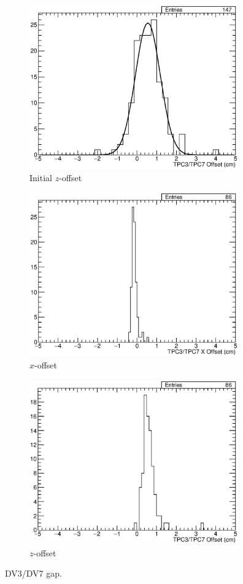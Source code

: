 \begin{figure}
  \centering
  \begin{subfigure}[t]{\linewidth}
    \centering
    \includegraphics[width=9cm]{TPC3TPC7Gap.eps}
    \caption{Initial $z$-offset}
    \label{fig:AppendixTPC3TPC7Gap}
  \end{subfigure}
  \vfill
  \begin{subfigure}[t]{\linewidth}
    \centering
    \includegraphics[width=9cm]{TPC3TPC7XOff.eps}
    \caption{$x$-offset}
    \label{fig:AppendixTPC3TPC7XOff}
  \end{subfigure}
  \vfill
  \begin{subfigure}[t]{\linewidth}
    \centering
    \includegraphics[width=9cm]{TPC3TPC7ZOff.eps}
    \caption{$z$-offset}
    \label{fig:AppendixTPC3TPC7ZOff}
  \end{subfigure}
  \caption[Demonstration of the measurements of the $x$- and $z$-offsets in the 35-ton DV3/DV7 gap.]{DV3/DV7 gap.}
  \label{fig:AppendixTPC3TPC7}
\end{figure}


